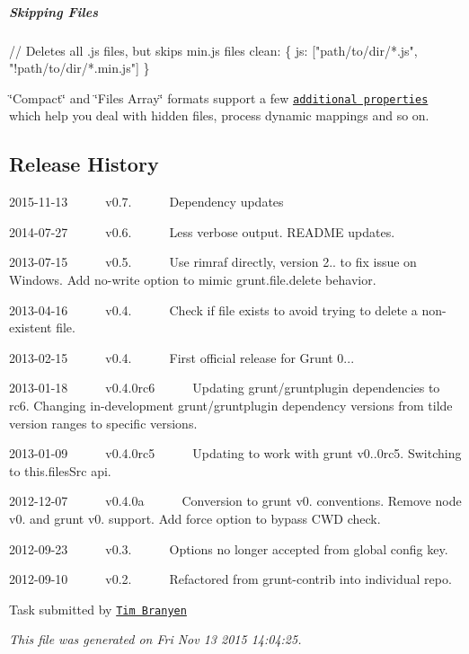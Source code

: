 \subparagraph*{Skipping Files}


\begin{DoxyCode}
// Deletes all .js files, but skips min.js files
clean: \{
  js: ["path/to/dir/*.js", "!path/to/dir/*.min.js"]
\}
\end{DoxyCode}


\char`\"{}\+Compact\char`\"{} and \char`\"{}\+Files Array\char`\"{} formats support a few \href{http://gruntjs.com/configuring-tasks#files}{\tt additional properties} which help you deal with hidden files, process dynamic mappings and so on.

\subsection*{Release History}


\begin{DoxyItemize}
\item 2015-\/11-\/13   v0.7.   \+Dependency updates
\item 2014-\/07-\/27   v0.6.   \+Less verbose output. R\+E\+A\+D\+ME updates.
\item 2013-\/07-\/15   v0.5.   \+Use rimraf directly, version 2.. to fix issue on Windows. Add no-\/write option to mimic grunt.\+file.\+delete behavior.
\item 2013-\/04-\/16   v0.4.   \+Check if file exists to avoid trying to delete a non-\/existent file.
\item 2013-\/02-\/15   v0.4.   \+First official release for Grunt 0...
\item 2013-\/01-\/18   v0.4.\+0rc6   \+Updating grunt/gruntplugin dependencies to rc6. Changing in-\/development grunt/gruntplugin dependency versions from tilde version ranges to specific versions.
\item 2013-\/01-\/09   v0.4.\+0rc5   \+Updating to work with grunt v0..\+0rc5. Switching to this.\+files\+Src api.
\item 2012-\/12-\/07   v0.4.\+0a   \+Conversion to grunt v0. conventions. Remove node v0. and grunt v0. support. Add force option to bypass C\+WD check.
\item 2012-\/09-\/23   v0.3.   \+Options no longer accepted from global config key.
\item 2012-\/09-\/10   v0.2.   \+Refactored from grunt-\/contrib into individual repo. 


\end{DoxyItemize}

Task submitted by \href{http://tbranyen.com/}{\tt Tim Branyen}

{\itshape This file was generated on Fri Nov 13 2015 14\+:04\+:25.} 